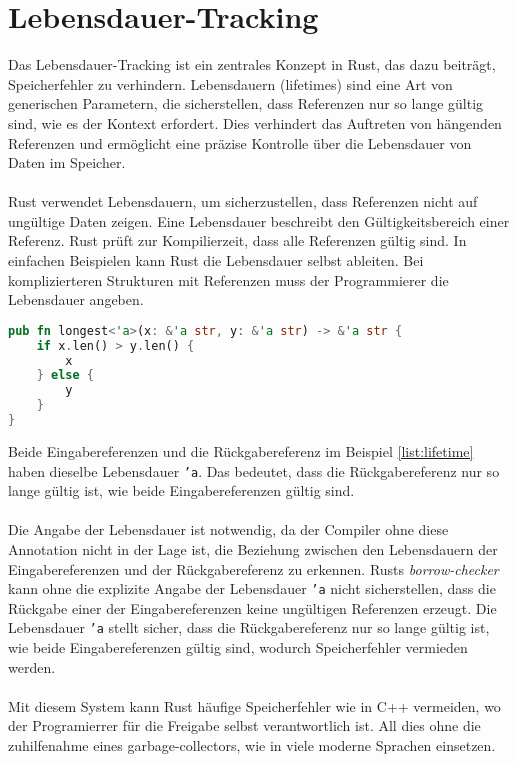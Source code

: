 \chapter{Lebensdauer-Tracking}

Das Lebensdauer-Tracking ist ein zentrales Konzept in Rust, das dazu beiträgt, Speicherfehler zu verhindern. 
Lebensdauern (lifetimes) sind eine Art von generischen Parametern, die sicherstellen, dass Referenzen nur so lange gültig sind, wie es der Kontext erfordert. 
Dies verhindert das Auftreten von hängenden Referenzen und ermöglicht eine präzise Kontrolle über die Lebensdauer von Daten im Speicher.\\
\\
Rust verwendet Lebensdauern, um sicherzustellen, dass Referenzen nicht auf ungültige Daten zeigen.
Eine Lebensdauer beschreibt den Gültigkeitsbereich einer Referenz. 
Rust prüft zur Kompilierzeit, dass alle Referenzen gültig sind. 
In einfachen Beispielen kann Rust die Lebensdauer selbst ableiten. 
Bei komplizierteren Strukturen mit Referenzen muss der Programmierer die Lebensdauer angeben.

\begin{lstlisting}[language=Rust, caption={Expliziete lifetime}, label=list:lifetime]
pub fn longest<'a>(x: &'a str, y: &'a str) -> &'a str {
    if x.len() > y.len() {
        x
    } else {
        y
    }
}
\end{lstlisting}
\noindent
Beide Eingabereferenzen und die Rückgabereferenz im Beispiel \ref{list:lifetime} haben dieselbe Lebensdauer \texttt{'a}. 
Das bedeutet, dass die Rückgabereferenz nur so lange gültig ist, wie beide Eingabereferenzen gültig sind.\\
\\
Die Angabe der Lebensdauer ist notwendig, da der Compiler ohne diese Annotation nicht in der Lage ist, die Beziehung zwischen den Lebensdauern der Eingabereferenzen und der Rückgabereferenz zu erkennen. 
Rusts \textit{\gls{borrow-checker}} kann ohne die explizite Angabe der Lebensdauer \texttt{'a} nicht sicherstellen, dass die Rückgabe einer der Eingabereferenzen keine ungültigen Referenzen erzeugt. 
Die Lebensdauer \texttt{'a} stellt sicher, dass die Rückgabereferenz nur so lange gültig ist, wie beide Eingabereferenzen gültig sind, wodurch Speicherfehler vermieden werden.\\
\\
Mit diesem System kann Rust häufige Speicherfehler wie in C++ vermeiden, wo der Programierrer für die Freigabe selbst verantwortlich ist.
All dies ohne die zuhilfenahme eines garbage-collectors, wie in viele moderne Sprachen einsetzen.
